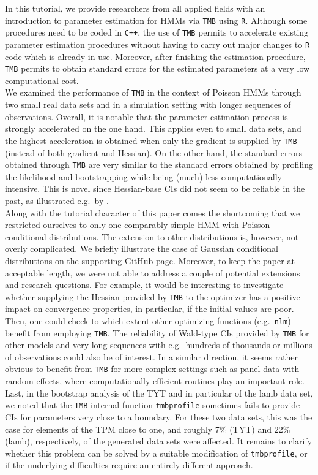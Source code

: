 \documentclass[bimj,fleqn]{w-art}\usepackage[]{graphicx}\usepackage[]{color}
\theoremstyle{plain}
\theoremstyle{definition}
\begin{document}
In this tutorial, we provide researchers from all applied fields with an introduction to parameter estimation for HMMs via {\tt{TMB}} using {\tt{R}}. Although some procedures need to be coded in {\tt{C++}}, the use of {\tt{TMB}} permits to accelerate existing parameter estimation procedures without having to carry out major changes to {\tt{R}} code which is already in use. Moreover, after finishing the estimation procedure, {\tt{TMB}} permits to obtain standard errors for the estimated parameters at a very low computational cost.\\
We examined the performance of {\tt{TMB}} in the context of Poisson HMMs through two small real data sets and in a simulation setting with longer sequences of observations. Overall, it is notable that the parameter estimation process is strongly accelerated on the one hand. This applies even to small data sets, and the highest acceleration is obtained when only the gradient is supplied by {\tt{TMB}} (instead of both gradient and Hessian). On the other hand, the standard errors obtained through {\tt{TMB}} are very similar to the standard errors obtained by profiling the likelihood and bootstrapping while being (much) less computationally intensive. This is novel since Hessian-base CIs did not seem to be reliable in the past, as illustrated e.g.~by \cite{visser}.\\
Along with the tutorial character of this paper comes the shortcoming that we restricted ourselves to only one comparably simple HMM with Poisson conditional distributions. The extension to other distributions is, however, not overly complicated. We briefly illustrate the case of Gaussian conditional distributions on the supporting GitHub page. Moreover, to keep the paper at acceptable length, we were not able to address a couple of potential extensions and research questions. For example, it would be interesting to investigate whether supplying the Hessian provided by {\tt{TMB}} to the optimizer has a positive impact on convergence properties, in particular, if the initial values are poor. Then, one could check to which extent other optimizing functions (e.g.~{\tt{nlm}}) benefit from employing {\tt{TMB}}. The reliability of Wald-type CIs provided by {\tt{TMB}} for other models and very long sequences with e.g.~hundreds of thousands or millions of observations could also be of interest. In a similar direction, it seems rather obvious to benefit from {\tt{TMB}} for more complex settings such as panel data with random effects, where computationally efficient routines play an important role. Last, in the bootstrap analysis of the TYT and in particular of the lamb data set, we noted that the {\tt{TMB}}-internal function {\tt tmbprofile} sometimes fails to provide CIs for parameters very close to a boundary. For these two data sets, this was the case for elements of the TPM close to one, and roughly 7\% (TYT) and 22\% (lamb), respectively, of the generated data sets were affected. It remains to clarify whether this problem can be solved by a suitable modification of {\tt tmbprofile}, or if the underlying difficulties require an entirely different approach.\\
\end{document}
